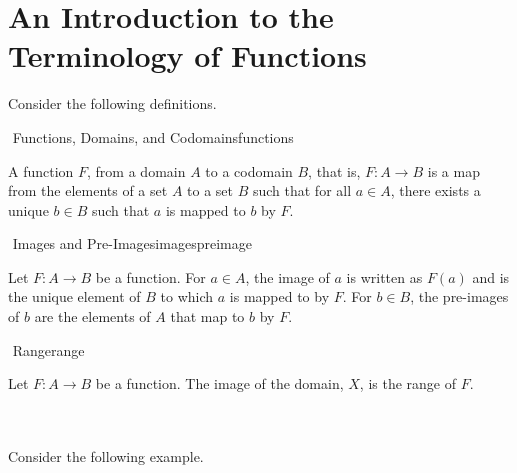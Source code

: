 \section{An Introduction to the Terminology of Functions}

    Consider the following definitions.
    \begin{definition}{\Stop\,\,Functions, Domains, and Codomains}{functions}

        A function \(F\), from a domain \(A\) to a codomain \(B\), that is, \(F:A\to B\) is a map from the elements of a set \(A\) to a set \(B\) such that for all \(a\in A\), there exists a unique \(b\in B\) such that \(a\) is mapped to \(b\) by \(F\).

    \end{definition}
    \begin{definition}{\Stop\,\,Images and Pre-Images}{imagespreimage}

        Let \(F:A\to B\) be a function. For \(a\in A\), the image of \(a\) is written as \(F(a)\) and is the unique element of \(B\) to which \(a\) is mapped to by \(F\). For \(b\in B\), the pre-images of \(b\) are the elements of \(A\) that map to \(b\) by \(F\).

    \end{definition}
    \begin{definition}{\Stop\,\,Range}{range}

        Let \(F:A\to B\) be a function. The image of the domain, \(X\), is the range of \(F\).
        
    \end{definition}
    \pagebreak
    \vphantom
    \\
    \\
    Consider the following example.
